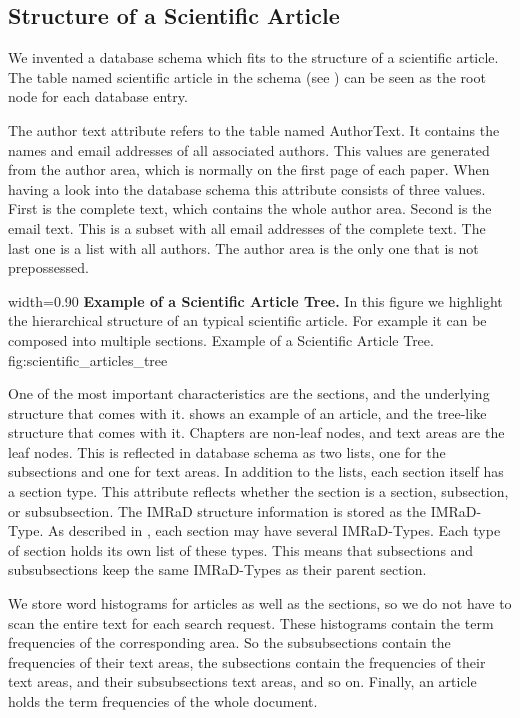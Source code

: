 \subsection{Structure of a Scientific Article}
\label{sec:structure_scientific_article}

We invented a database schema which fits to the structure of a scientific article. The table named scientific article in the schema (see ) can be seen as the root node for each database entry.

The author text attribute refers to the table named AuthorText. It contains the names and email addresses of all associated authors. This values are generated from the author area, which is normally on the first page of each paper. When having a look into the database schema this attribute consists of three values. First is the complete text, which contains the whole author area. Second is the email text. This is a subset with all email addresses of the complete text. The last one is a list with all authors. The author area is the only one that is not prepossessed.

      {width=0.90\textwidth}
      {\textbf{Example of a Scientific Article Tree.} In this figure we highlight the hierarchical structure of an typical scientific article. For example it can be composed into multiple sections.}
      {Example of a Scientific Article Tree.}
      {fig:scientific_articles_tree}

One of the most important characteristics are the sections, and the underlying structure that comes with it.  shows an example of an article, and the tree-like structure that comes with it. Chapters are non-leaf nodes, and text areas are the leaf nodes. This is reflected in database schema as two lists, one for the subsections and one for text areas. In addition to the lists, each section itself has a section type. This attribute reflects whether the section is a section, subsection, or subsubsection. The IMRaD structure information is stored as the IMRaD-Type. As described in , each section may have several IMRaD-Types. Each type of section holds its own list of these types. This means that subsections and subsubsections keep the same IMRaD-Types as their parent section.

We store word histograms for articles as well as the sections, so we do not have to scan the entire text for each search request. These histograms contain the term frequencies of the corresponding area. So the subsubsections contain the frequencies of their text areas, the subsections contain the frequencies of their text areas, and their subsubsections text areas, and so on. Finally, an article holds the term frequencies of the whole document.

